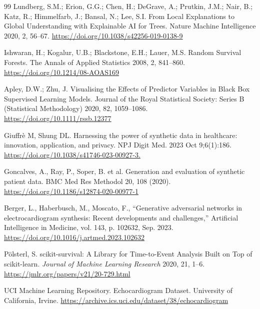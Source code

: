 \documentclass[a4paper,12pt]{article}
\begin{document}
\begin{thebibliography}{99}
 Lundberg, S.M.; Erion, G.G.; Chen, H.; DeGrave, A.; Prutkin, J.M.; Nair, B.; Katz, R.; Himmelfarb, J.; Bansal, N.; Lee, S.I. From Local Explanations to Global Understanding with Explainable AI for Trees. Nature Machine Intelligence 2020, 2, 56–67. \url{https://doi.org/10.1038/s42256-019-0138-9}


 Ishwaran, H.; Kogalur, U.B.; Blackstone, E.H.; Lauer, M.S. Random Survival Forests. The Annals of Applied Statistics 2008, 2, 841–860. \url{https://doi.org/10.1214/08-AOAS169}


 Apley, D.W.; Zhu, J. Visualising the Effects of Predictor Variables in Black Box Supervised Learning Models. Journal of the Royal Statistical Society: Series B (Statistical Methodology) 2020, 82, 1059–1086. \url{https://doi.org/10.1111/rssb.12377}

 Giuffrè M, Shung DL. Harnessing the power of synthetic data in healthcare: innovation, application, and privacy. NPJ Digit Med. 2023 Oct 9;6(1):186. 
\url{https://doi.org/10.1038/s41746-023-00927-3.} 

 Goncalves, A., Ray, P., Soper, B. et al. Generation and evaluation of synthetic patient data. BMC Med Res Methodol 20, 108 (2020). 
\url{https://doi.org/10.1186/s12874-020-00977-1}

Berger, L., Haberbusch, M., Moscato, F., “Generative adversarial networks in electrocardiogram synthesis: Recent developments and challenges,” Artificial Intelligence in Medicine, vol. 143, p. 102632, Sep. 2023.
\url{https://doi.org/10.1016/j.artmed.2023.102632}



 Pölsterl, S. scikit-survival: A Library for Time-to-Event Analysis Built on Top of scikit-learn. \textit{Journal of Machine Learning Research} 2020, 21, 1--6. \url{https://jmlr.org/papers/v21/20-729.html}

 UCI Machine Learning Repository. Echocardiogram Dataset. University of California, Irvine. \url{https://archive.ics.uci.edu/dataset/38/echocardiogram}

\end{thebibliography}
\end{document}
